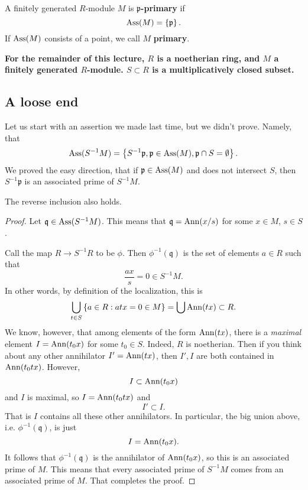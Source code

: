 \begin{definition} 
A finitely generated $R$-module $M$ is \textbf{$\mathfrak{p}$-primary} if 
\[ \operatorname{Ass}(M) = \left\{\mathfrak{p}\right\} . \]
If $\operatorname{Ass}(M)$ consists of a point, we call $M$ \textbf{primary}.
\end{definition} 



\textbf{For the remainder of this lecture, $R$ is a noetherian ring, and $M$ a
finitely generated $R$-module. $S \subset R$ is a multiplicatively closed
subset.}


\subsection{A loose end}
Let us start with an assertion we made last time, but we didn't prove. Namely,
that
\[ \operatorname{Ass}(S^{-1}M) = \left\{S^{-1}\mathfrak{p}, \mathfrak{p} \in \operatorname{Ass}(M),
\mathfrak{p} \cap S = \emptyset\right\}.  \]
We proved the easy direction, that if $\mathfrak{p} \in \operatorname{Ass}(M)$ and does not
intersect $S$, then $S^{-1}\mathfrak{p}$ is an associated prime of $S^{-1}M$.

\begin{proposition} 
The reverse inclusion also holds.
\end{proposition} 
\begin{proof} 
Let $\mathfrak{q} \in \operatorname{Ass}(S^{-1}M)$. This means that $\mathfrak{q} =
\operatorname{Ann}(x/s)$ for some $x \in M$, $s \in S$. 

Call the map $R \to S^{-1}R  $ to be $\phi$.
Then $\phi^{-1}(\mathfrak{q})$ is the set of elements $a \in R$ such that
\[ \frac{ax}{s} = 0 \in S^{-1}M . \]
In other words, by definition of the localization, this is 
\[ \bigcup_{t \in S} \left\{a \in R: atx = 0 \in M\right\} = \bigcup \operatorname{Ann}(tx)
\subset R.\]
We know, however, that among elements of the form $\operatorname{Ann}(tx)$, there is a
\emph{maximal} element $I=\operatorname{Ann}(t_0 x)$ for some $t_0 \in S$. Indeed, $R$ is
noetherian. 
Then if you think about any other annihilator $I' = \operatorname{Ann}(tx)$, then $I', I$ are
both contained in $\operatorname{Ann}(t_0 t x)$. However, 
\[ I \subset \operatorname{Ann}(t_0 x)  \]
and $I$ is maximal, so $I = \operatorname{Ann}(t_0 t x)$ and
\[ I' \subset I.  \] That is $I$ contains all these other annihilators.
In particular, the big union above, i.e. $\phi^{-1}(\mathfrak{q})$, is just
\[ I = \operatorname{Ann}(t_0 x).  \]
It follows that $\phi^{-1}(\mathfrak{q})$ is the annihilator of $\operatorname{Ann}(t_0 x)$,
so this is an associated prime of $M$. This means that every associated prime
of $S^{-1}M$ comes from an associated prime of $M$. That completes the proof.
\end{proof} 

